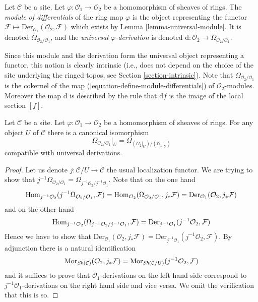 \begin{definition}
\label{definition-module-differentials}
Let $\mathcal{C}$ be a site. Let $\varphi : \mathcal{O}_1 \to \mathcal{O}_2$
be a homomorphism of sheaves of rings. The {\it module of differentials}
of the ring map $\varphi$ is the object representing the functor
$\mathcal{F} \mapsto \text{Der}_{\mathcal{O}_1}(\mathcal{O}_2, \mathcal{F})$
which exists by Lemma \ref{lemma-universal-module}.
It is denoted $\Omega_{\mathcal{O}_2/\mathcal{O}_1}$, and the {\it universal
$\varphi$-derivation} is denoted
$\text{d} : \mathcal{O}_2 \to \Omega_{\mathcal{O}_2/\mathcal{O}_1}$.
\end{definition}

\noindent
Since this module and the derivation form the universal object representing
a functor, this notion is clearly intrinsic (i.e., does not depend
on the choice of the site underlying the ringed topos, see
Section \ref{section-intrinsic}).
Note that $\Omega_{\mathcal{O}_2/\mathcal{O}_1}$ is the cokernel of
the map (\ref{equation-define-module-differentials}) of
$\mathcal{O}_2$-modules. Moreover the map $\text{d}$ is described
by the rule that $\text{d}f$ is the image of the local section $[f]$.

\begin{lemma}
\label{lemma-localize-differentials}
Let $\mathcal{C}$ be a site. Let $\varphi : \mathcal{O}_1 \to \mathcal{O}_2$
be a homomorphism of sheaves of rings. For any object $U$ of $\mathcal{C}$
there is a canonical isomorphism
$$
\Omega_{\mathcal{O}_2/\mathcal{O}_1}|_U =
\Omega_{(\mathcal{O}_2|_U)/(\mathcal{O}_1|_U)}
$$
compatible with universal derivations.
\end{lemma}

\begin{proof}
Let us denote $j : \mathcal{C}/U \to \mathcal{C}$ the usual localization
functor. We are trying to show that
$j^{-1}\Omega_{\mathcal{O}_2/\mathcal{O}_1} =
\Omega_{j^{-1}\mathcal{O}_2/j^{-1}\mathcal{O}_1}$.
Note that on the one hand
$$
\mathop{\rm Hom}\nolimits_{j^{-1}\mathcal{O}_2}
(j^{-1}\Omega_{\mathcal{O}_2/\mathcal{O}_1}, \mathcal{F}) =
\mathop{\rm Hom}\nolimits_{\mathcal{O}_2}
(\Omega_{\mathcal{O}_2/\mathcal{O}_1}, j_*\mathcal{F}) =
\text{Der}_{\mathcal{O}_1}(\mathcal{O}_2, j_*\mathcal{F})
$$
and on the other hand
$$
\mathop{\rm Hom}\nolimits_{j^{-1}\mathcal{O}_2}
(\Omega_{j^{-1}\mathcal{O}_2/j^{-1}\mathcal{O}_1}, \mathcal{F}) =
\text{Der}_{j^{-1}\mathcal{O}_1}(j^{-1}\mathcal{O}_2, \mathcal{F})
$$
Hence we have to show that
$\text{Der}_{\mathcal{O}_1}(\mathcal{O}_2, j_*\mathcal{F}) =
\text{Der}_{j^{-1}\mathcal{O}_1}(j^{-1}\mathcal{O}_2, \mathcal{F})$.
By adjunction there is a natural identification
$$
\mathop{\rm Mor}\nolimits_{\mathop{\textit{Sh}}\nolimits(\mathcal{C})}(\mathcal{O}_2, j_*\mathcal{F}) =
\mathop{\rm Mor}\nolimits_{\mathop{\textit{Sh}}\nolimits(\mathcal{C}/U)}(j^{-1}\mathcal{O}_2, \mathcal{F})
$$
and it suffices to prove that $\mathcal{O}_1$-derivations on the
left hand side correspond to $j^{-1}\mathcal{O}_1$-derivations on the
right hand side and vice versa. We omit the verification that this is so.
\end{proof}


